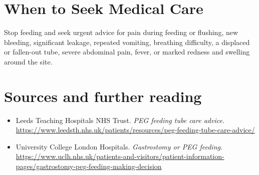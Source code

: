 \section*{When to Seek Medical Care}
Stop feeding and seek urgent advice for pain during feeding or flushing, new bleeding, significant leakage, repeated vomiting, breathing difficulty, a displaced or fallen-out tube, severe abdominal pain, fever, or marked redness and swelling around the site.

\section*{Sources and further reading}
\begin{itemize}
\item Leeds Teaching Hospitals NHS Trust. \textit{PEG feeding tube care advice}. \url{https://www.leedsth.nhs.uk/patients/resources/peg-feeding-tube-care-advice/}
\item University College London Hospitals. \textit{Gastrostomy or PEG feeding}. \url{https://www.uclh.nhs.uk/patients-and-visitors/patient-information-pages/gastrostomy-peg-feeding-making-decision}
\end{itemize}
